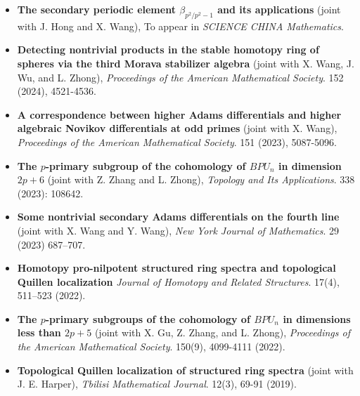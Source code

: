 \documentclass[12pt,a4paper,sans,fontset=windows]{moderncv} %
\begin{document}
\begin{itemize}[wide=30pt, leftmargin=*]
    \item \textbf{The secondary periodic element $\beta_{p^2/p^2-1}$ and its applications}
        \newline (joint with J. Hong and X. Wang), To appear in \textit{SCIENCE CHINA Mathematics}.   
    \item \textbf{Detecting nontrivial products in the stable homotopy ring of spheres via the third Morava stabilizer algebra}
    \newline (joint with X. Wang, J. Wu, and L. Zhong), \textit{Proceedings of the American Mathematical Society}. 152 (2024), 4521-4536.
    \item \textbf{A correspondence between higher Adams differentials and higher algebraic Novikov differentials at odd primes}
        \newline (joint with X. Wang), \textit{Proceedings of the American Mathematical Society}. 151 (2023), 5087-5096.
    \item \textbf{The $p$-primary subgroup of the cohomology of $BPU_n$ in dimension $2p+6$}
        \newline (joint with Z. Zhang and L. Zhong), \textit{Topology and Its Applications}.  338 (2023): 108642.
    \item \textbf{Some nontrivial secondary Adams differentials on the fourth line}
        \newline (joint with X. Wang and Y. Wang),  \textit{New York Journal of Mathematics}.  29 (2023) 687–707.
    \item \textbf{Homotopy pro-nilpotent structured ring spectra and topological Quillen localization}
        \newline \textit{Journal of Homotopy and Related Structures}. 17(4), 511–523 (2022).
    \item \textbf{The $p$-primary subgroups of the cohomology of $BPU_n$ in dimensions less than $2p+5$}
        \newline (joint with X. Gu, Z. Zhang, and L. Zhong), \textit{Proceedings of the American Mathematical Society}. 150(9), 4099-4111 (2022). 
    \item \textbf{Topological Quillen localization of structured ring spectra}
        \newline (joint with J. E. Harper), \textit{Tbilisi Mathematical Journal}. 12(3), 69-91 (2019). 
\end{itemize}

\vspace{2pt} 
\end{document}
